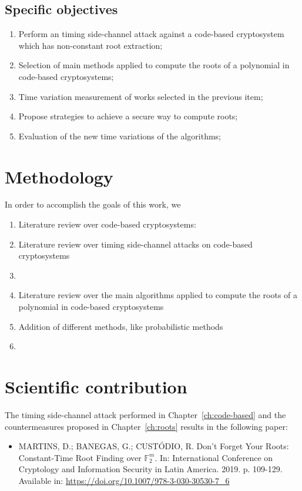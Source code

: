 \subsection{Specific objectives}
\begin{enumerate}[label=\roman*., itemsep=1pt]
    \item Perform an timing side-channel attack against a code-based cryptosystem which has non-constant root extraction;
    \item Selection of main methods applied to compute the roots of a polynomial in code-based cryptosystems;
    \item Time variation measurement of works selected in the previous item;
    \item Propose strategies to achieve a secure way to compute roots;
    \item Evaluation of the new time variations of the algorithms;
\end{enumerate}


\section{Methodology}
In order to accomplish the goals of this work, we 
\begin{enumerate}
    \item Literature review over code-based cryptosystems:
    \item Literature review over timing side-channel attacks on code-based cryptosystems
    \item 
    \item Literature review over the main algorithms applied to compute the roots of a polynomial in code-based cryptosystems
    \item Addition of different methods, like probabilistic methods
    \item 
\end{enumerate}

\section{Scientific contribution}
The timing side-channel attack performed in Chapter~\ref{ch:code-based} and the countermeasures proposed in Chapter~\ref{ch:roots} results in the following paper:

\begin{itemize}
    \item  MARTINS, D.; BANEGAS, G.; CUSTÓDIO, R. Don’t Forget Your Roots: Constant-Time Root Finding over $\mathbb{F}_2^m$. In: International Conference on Cryptology and Information Security in Latin America.  2019. p. 109-129. Available in: \url{https://doi.org/10.1007/978-3-030-30530-7_6}
\end{itemize}


